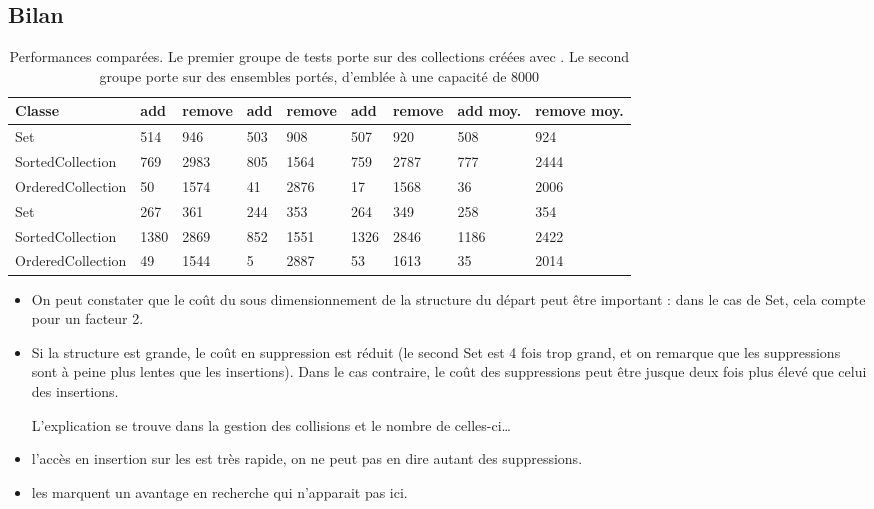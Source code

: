 \subsection{Bilan}

\begin{table}[htb]
\begin{center}
\begin{tabular}{|l|l|l|l|l|l|l|l|l|}\hline
Classe & add & remove& add & remove& add & remove& add moy. & remove moy. \\\hline\hline
Set & 514 & 946 & 503 & 908 & 507 & 920 & 508 & 924\\\hline
SortedCollection & 769 & 2983 & 805 & 1564 & 759 & 2787 & 777 & 2444\\\hline
OrderedCollection & 50 & 1574 & 41 & 2876 & 17 & 1568 & 36 & 2006\\\hline\hline
Set & 267 & 361 & 244 & 353 & 264 & 349 & 258 & 354\\\hline
SortedCollection & 1380 & 2869 & 852 & 1551 & 1326 & 2846 & 1186 & 2422\\\hline
OrderedCollection & 49 & 1544 & 5 & 2887 & 53 & 1613 & 35 & 2014\\\hline
\end{tabular}
\caption{Performances compar\'ees. Le premier groupe de tests porte sur des
collections cr\'e\'ees avec . Le second groupe porte sur
des ensembles port\'es, d'embl\'ee \`a une capacit\'e de 8000 }
\label{tab:perf}
\end{center}
\end{table}

\begin{itemize}
\item On peut constater que le co\^ut du sous dimensionnement de la structure du d\'epart peut \^etre important : dans le cas de Set, cela compte pour un facteur 2.
\item Si la structure est grande, le co\^ut en suppression est r\'eduit (le second Set
est 4 fois trop grand, et on remarque que les suppressions sont \`a peine plus lentes
que les insertions). Dans le cas contraire, le co\^ut des suppressions peut \^etre jusque
deux fois plus \'elev\'e que celui des insertions.

L'explication se trouve dans la gestion des collisions et le nombre de celles-ci\ldots

\item l'acc\`es en insertion sur les  est tr\`es rapide, 
on ne peut pas en dire autant des suppressions.
\item les  marquent un avantage en recherche qui n'apparait pas ici.
\end{itemize}
 

